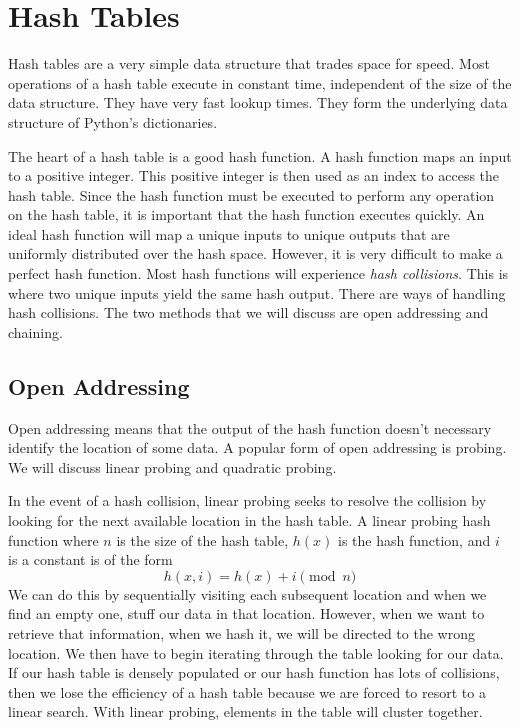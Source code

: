\section*{Hash Tables}
Hash tables are a very simple data structure that trades space for speed.
Most operations of a hash table execute in constant time, independent of the size of the data structure.  They have very fast lookup times.  They form the underlying data structure of Python's dictionaries.

The heart of a hash table is a good hash function.  A hash function maps an input to a positive integer.  This positive integer is then used as an index to access the hash table.  Since the hash function must be executed to perform any operation on the hash table, it is important that the hash function executes quickly.
An ideal hash function will map a unique inputs to unique outputs that are uniformly distributed over the hash space.  However, it is very difficult to make a perfect hash function.  Most hash functions will experience \emph{hash collisions}.  This is where two unique inputs yield the same hash output.
There are ways of handling hash collisions.  The two methods that we will discuss are open addressing and chaining.

\subsection*{Open Addressing}
Open addressing means that the output of the hash function doesn't necessary identify the location of some data.
A popular form of open addressing is probing. 
We will discuss linear probing and quadratic probing.

In the event of a hash collision, linear probing seeks to resolve the collision by looking for the next available location in the hash table.
A linear probing hash function where $n$ is the size of the hash table, $h(x)$ is the hash function, and $i$ is a constant is of the form
\begin{equation*}
h(x, i) = h(x) + i \pmod{n}
\end{equation*}
We can do this by sequentially visiting each subsequent location and when we find an empty one, stuff our data in that location.  
However, when we want to retrieve that information, when we hash it, we will be directed to the wrong location. 
We then have to begin iterating through the table looking for our data.
If our hash table is densely populated or our hash function has lots of collisions, then we lose the efficiency of a hash table because we are forced to resort to a linear search.
With linear probing, elements in the table will cluster together.

